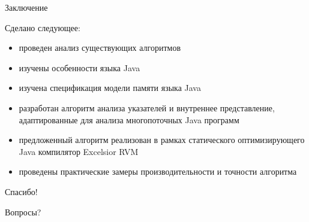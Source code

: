 \documentclass[usenames,dvipsnames,pdftex,unicode]{beamer}
\begin{document}
\begin{frame}{Заключение}

  Сделано следующее:
  \begin{itemize}
    \item проведен анализ существующих алгоритмов
    \item изучены особенности языка Java
    \item изучена спецификация модели памяти языка Java
    \item разработан алгоритм анализа указателей и внутреннее представление,
          адаптированные для анализа многопоточных Java программ
    \item предложенный алгоритм реализован в рамках статического
          оптимизирующего Java компилятор Excelsior RVM
    \item проведены практические замеры производительности и точности алгоритма
  \end{itemize}

\end{frame}

\begin{frame}

  \centering\huge

  Спасибо!

  Вопросы?

\end{frame}
\end{document}
